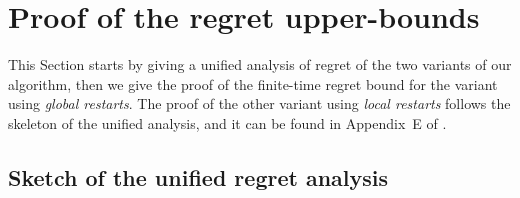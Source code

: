 

\section{Proof of the regret upper-bounds}
\label{sec:6:proofRegret}

This Section starts by giving a unified analysis of regret of the two variants of our algorithm, then we give the proof of the finite-time regret bound for the variant using \emph{global restarts}.
The proof of the other variant using \emph{local restarts} follows the skeleton of the unified analysis, and it can be found in Appendix~E of \cite{Besson2019GLRT}.

\subsection{Sketch of the unified regret analysis}
\label{sub:6:proofSkeleton}

